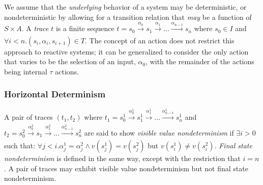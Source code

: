 We assume that the \emph{underlying} behavior of a system may be
deterministic, or nondeterministic  by allowing
for a transition relation that \emph{may} be a function of
$S \times A$.  A \emph{trace} $t$ is a finite sequence $t = s_0
\xrightarrow[]{\alpha_0} s_1 \xrightarrow[]{\alpha_1} \ldots
\xrightarrow[]{\alpha_{n-1}} s_n$ where $s_0 \in I$ and $\forall i < n
. (s_i, \alpha_i, s_{i+1}) \in T$.  The concept of an action does not restrict this approach to reactive
systems; it can be generalized to consider the only action that varies
to be the selection of an input, $\alpha_0$, with the remainder of the
actions being internal $\tau$ actions.

\subsubsection{Horizontal Determinism}

A pair of traces $(t_1, t_2)$ where $t_1 = s^1_0
\xrightarrow[]{\alpha^1_0} s^1_1 \xrightarrow[]{\alpha^1_1} \ldots
\xrightarrow[]{\alpha^1_{n-1}} s^1_n$ and $t_2 = s^2_0
\xrightarrow[]{\alpha^2_0} s_1 \xrightarrow[]{\alpha^2_1} \ldots
\xrightarrow[]{\alpha^2_{n-1}} s^2_n$ are said to show \emph{visible value
  nondeterminism} if $\exists i > 0$ such that: $\forall j < i . \alpha^1_j = \alpha^2_j \wedge
v(s^1_j) = v(s^2_j)$ but $v(s^1_i) \neq v(s^2_i)$.  \emph{Final state
  nondeterminism} is defined in the same way, except with the
restriction that $i = n$.  A pair of traces may exhibit visible value
nondeterminism but not final state nondeterminism.

